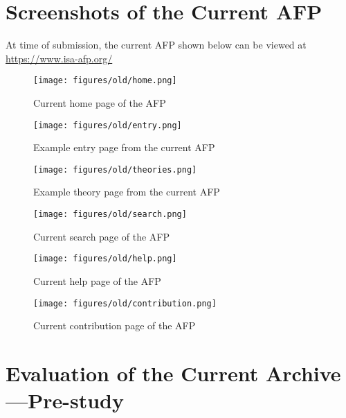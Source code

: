 \documentclass[bsc,frontabs,oneside,singlespacing,parskip,deptreport,logo]{infthesis}
\begin{document}



\appendix \label{app:1}

\chapter{Screenshots of the Current AFP}

At time of submission, the current AFP shown below can be viewed at \url{https://www.isa-afp.org/}

\begin{figure}[h]
    \centering
    \texttt{[image: figures/old/home.png]}
    \caption{Current home page of the AFP}

\end{figure}

\begin{figure}[h]
    \centering
    \texttt{[image: figures/old/entry.png]}
    \caption{Example entry page from the current AFP}
    \label{fig:entry-current}
\end{figure}

\begin{figure}[h]
    \centering
    \texttt{[image: figures/old/theories.png]}
    \caption{Example theory page from the current AFP}
    \label{afpScriptBrowsing}
\end{figure}

\begin{figure}[h]
    \centering
    \texttt{[image: figures/old/search.png]}
    \caption{Current search page of the AFP}
    \label{fig:entry-search}
\end{figure}

\begin{figure}[h]
    \centering
    \texttt{[image: figures/old/help.png]}
    \caption{Current help page of the AFP}

\end{figure}

\begin{figure}[h]
    \centering
    \texttt{[image: figures/old/contribution.png]}
    \caption{Current contribution page of the AFP}

\end{figure}

\chapter{Evaluation of the Current Archive---Pre-study} \label{prestudy}
\end{document}
